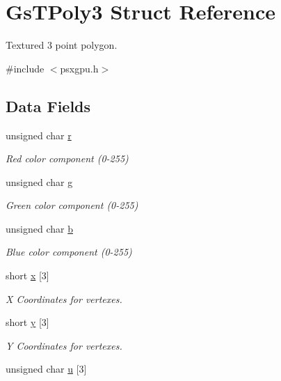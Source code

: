 \hypertarget{structGsTPoly3}{}\section{Gs\+T\+Poly3 Struct Reference}
\label{structGsTPoly3}


Textured 3 point polygon.  




{\ttfamily \#include $<$psxgpu.\+h$>$}

\subsection*{Data Fields}
\begin{DoxyCompactItemize}
\item 
unsigned char \hyperlink{structGsTPoly3_a377534efc910699a7515c773ce93ba3e}{r}
\begin{DoxyCompactList}\small\item\em Red color component (0-\/255) \end{DoxyCompactList}\item 
unsigned char \hyperlink{structGsTPoly3_a4bef416306bb3d0710b26fefc75a3e6e}{g}
\begin{DoxyCompactList}\small\item\em Green color component (0-\/255) \end{DoxyCompactList}\item 
unsigned char \hyperlink{structGsTPoly3_a889229e60bd4bfed549ee3fc5e9346da}{b}
\begin{DoxyCompactList}\small\item\em Blue color component (0-\/255) \end{DoxyCompactList}\item 
short \hyperlink{structGsTPoly3_ace20bf105754c114fbc0edd4f6da6f39}{x} \mbox{[}3\mbox{]}
\begin{DoxyCompactList}\small\item\em X Coordinates for vertexes. \end{DoxyCompactList}\item 
short \hyperlink{structGsTPoly3_a224a67e5dbe4fddc7a638979a8a6501e}{y} \mbox{[}3\mbox{]}
\begin{DoxyCompactList}\small\item\em Y Coordinates for vertexes. \end{DoxyCompactList}\item 
unsigned char \hyperlink{structGsTPoly3_abe4334142f3a9953479fd82cc9962c27}{u} \mbox{[}3\mbox{]}

\end{DoxyCompactItemize}
